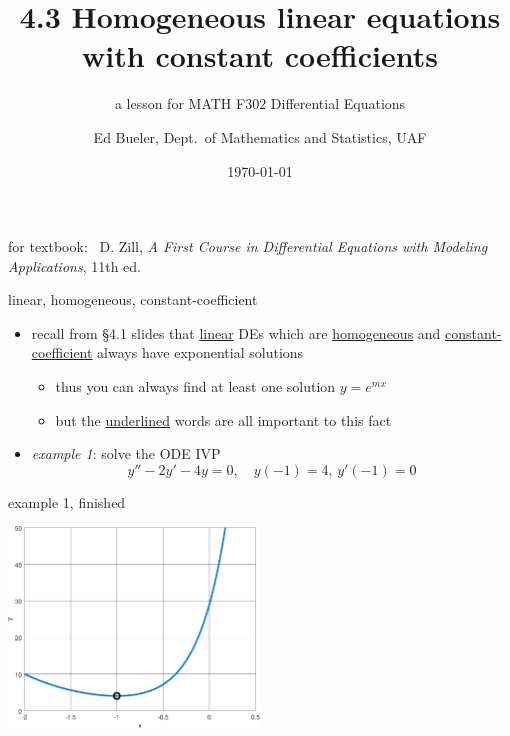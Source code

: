 \documentclass{beamer}
\title{4.3 Homogeneous linear equations \\ with constant coefficients}
\subtitle{a lesson for MATH F302 Differential Equations}
\author{Ed Bueler, Dept.~of Mathematics and Statistics, UAF}
\date{\tiny \today}
\begin{document}


\begin{frame}
\titlepage

\centerline{\tiny for textbook: \, D. Zill, \emph{A First Course in Differential Equations with Modeling Applications}, 11th ed.}
\end{frame}


\begin{frame}{linear, homogeneous, constant-coefficient}

\begin{itemize}
\item recall from \S4.1 slides that \underline{linear} DEs which are \underline{homogeneous} and \underline{constant-coefficient} always have exponential solutions
    \begin{itemize}
    \item thus you can always find at least one solution $y=e^{mx}$
    \item but the \underline{underlined} words are all important to this fact
    \end{itemize}
\item \emph{example 1}: solve the ODE IVP
    $$y'' -2 y' - 4 y = 0, \quad y(-1)=4, \, y'(-1)=0$$

\vspace{30mm}
\end{itemize}
\end{frame}


\begin{frame}{example 1, finished}

\vspace{35mm}

\hfill \includegraphics[width=0.5\textwidth]{figs/expodeivp2nd}
\end{frame}
\end{document}
